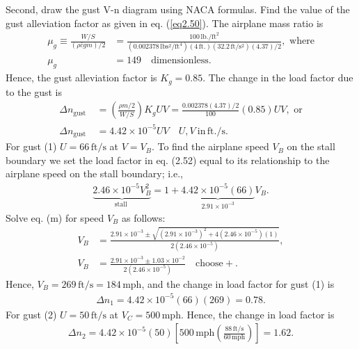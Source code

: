 \documentclass{AeroStructure-ERJohnson}
\begin{document}
Second, draw the gust V-n diagram using NACA formulas. Find the value of the gust alleviation factor as given in eq. (\ref{eq2.50}). The airplane mass ratio is
\begin{align}\label{ex2.6i}
\mu_{g} \equiv \frac{W/S}{(\rho \bar{c} g m)/2}&=\frac{100\,\mathrm{lb}./\mathrm{ft}^{2}}{(0.002378\,\mathrm{lb} \mathrm{s}^{2}/\mathrm{ft}^{4})(4\,\mathrm{ft}.)(32.2\,\mathrm{ft}/\mathrm{s}^{2})(4.37)/2},\mbox{ where}\\
\mu_{g}&=149\quad\mbox{dimensionless.}\nonumber
\end{align}
Hence, the gust alleviation factor is $K_{g}=0.85$. The change in the load factor due to the gust is
\begin{align}
\Delta n_{\text {gust }}&=\left(\frac{\rho m/2}{W/S}\right) K_{g} U V=\frac{0.002378(4.37)/2}{100}(0.85) U V,\mbox{ or}\label{ex2.6k}\\
\Delta n_{\text {gust }}&=4.42 \times 10^{-5} U V \quad U, V~\text{in}\,\mathrm{ft}./\mathrm{s}.\label{ex2.6l}
\end{align}
For gust (1) $U=66\,\mathrm{ft}/\mathrm{s}$ at $V=V_{B}$. To find the airplane speed $V_{B}$ on the stall boundary we set the load factor in eq. (2.52) equal to its relationship to the airplane speed on the stall boundary; i.e.,
\begin{align}\label{ex2.6m}
\underbrace{2.46 \times 10^{-5} V_{B}^{2}}_{\text {stall }}=1+\underbrace{4.42 \times 10^{-5}(66)}_{2.91 \times 10^{-3}} V_{B}.
\end{align}
Solve eq. (m) for speed $V_{B}$ as follows:
\begin{align}\label{ex2.6n}
V_{B} &=\frac{2.91 \times 10^{-3} \pm \sqrt{\left(2.91 \times 10^{-3}\right)^{2}+4\left(2.46 \times 10^{-5}\right)(1)}}{2\left(2.46 \times 10^{-5}\right)},\nonumber\\
V_{B}&=\frac{2.91 \times 10^{-3} \pm 1.03 \times 10^{-2}}{2\left(2.46 \times 10^{-5}\right)}\quad\mbox{choose} +.
\end{align}
Hence, $V_{B}=269\,\mathrm{ft}/\mathrm{s}=184\,\mathrm{mph}$, and the change in load factor for gust (1) is
\begin{align}\label{ex2.6o}
\Delta n_{1}=4.42 \times 10^{-5}(66)(269)=0.78.
\end{align}
For gust (2) $U=50\,\mathrm{ft}/\mathrm{s}$ at $V_{C}=500\,\mathrm{mph}$. Hence, the change in load factor is
\begin{align}\label{ex2.6p}
\Delta n_{2}=4.42 \times 10^{-5}(50)\left[500\,\mathrm{mph}\left(\frac{88\,\mathrm{ft}/ \mathrm{s}}{60\,\mathrm{mph}}\right)\right]=1.62.
\end{align}
\end{document}
